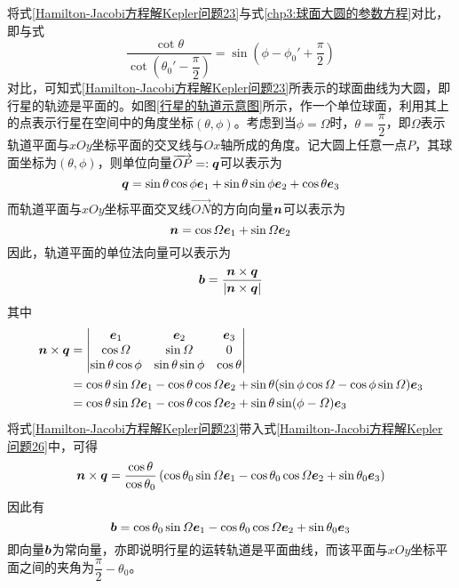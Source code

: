 将式\eqref{Hamilton-Jacobi方程解Kepler问题23}与式\eqref{chp3:球面大圆的参数方程}对比，即与式
\begin{equation}
	\frac{\cot\theta}{\cot\left(\theta_0'-\dfrac{\pi}{2}\right)} = \sin\left(\phi-\phi_0'+\frac{\pi}{2}\right)
	\label{Hamilton-Jacobi方程解Kepler问题24}
\end{equation}
对比，可知式\eqref{Hamilton-Jacobi方程解Kepler问题23}所表示的球面曲线为大圆，即行星的轨迹是平面的。如图\ref{行星的轨道示意图}所示，作一个单位球面，利用其上的点表示行星在空间中的角度坐标$(\theta,\phi)$。考虑到当$\phi=\varOmega$时，$\theta=\dfrac{\pi}{2}$，即$\varOmega$表示轨道平面与$xOy$坐标平面的交叉线与$Ox$轴所成的角度。记大圆上任意一点$P$，其球面坐标为$(\theta,\phi)$，则单位向量$\overrightarrow{OP}=:\boldsymbol{q}$可以表示为
\begin{equation}
	\boldsymbol{q} = \sin\theta\cos\phi\boldsymbol{e}_1+\sin\theta\sin\phi\boldsymbol{e}_2+\cos\theta\boldsymbol{e}_3
	\label{Hamilton-Jacobi方程解Kepler问题24-q}
\end{equation}
而轨道平面与$xOy$坐标平面交叉线$\overrightarrow{ON}$的方向向量$\boldsymbol{n}$可以表示为
\begin{equation}
	\boldsymbol{n} = \cos\varOmega\boldsymbol{e}_1+\sin\varOmega\boldsymbol{e}_2
	\label{Hamilton-Jacobi方程解Kepler问题24-n}
\end{equation}
因此，轨道平面的单位法向量可以表示为
\begin{equation}
	\boldsymbol{b} = \frac{\boldsymbol{n}\times \boldsymbol{q}}{|\boldsymbol{n}\times \boldsymbol{q}|}
	\label{Hamilton-Jacobi方程解Kepler问题25}
\end{equation}
其中
\begin{align}
	\boldsymbol{n}\times \boldsymbol{q} & = \begin{vmatrix} \boldsymbol{e}_1 & \boldsymbol{e}_2 & \boldsymbol{e}_3 \\ \cos\varOmega & \sin\varOmega & 0 \\ \sin\theta\cos\phi & \sin\theta\sin\phi & \cos\theta \end{vmatrix} \nonumber \\
	& = \cos\theta\sin\varOmega\boldsymbol{e}_1 - \cos\theta\cos\varOmega\boldsymbol{e}_2+\sin\theta(\sin\phi\cos\varOmega-\cos\phi\sin\varOmega)\boldsymbol{e}_3 \nonumber \\
	& = \cos\theta\sin\varOmega\boldsymbol{e}_1 - \cos\theta\cos\varOmega\boldsymbol{e}_2+\sin\theta\sin(\phi-\varOmega)\boldsymbol{e}_3
	\label{Hamilton-Jacobi方程解Kepler问题26}
\end{align}
将式\eqref{Hamilton-Jacobi方程解Kepler问题23}带入式\eqref{Hamilton-Jacobi方程解Kepler问题26}中，可得
\begin{equation}
	\boldsymbol{n}\times \boldsymbol{q} = \frac{\cos\theta}{\cos\theta_0}\left(\cos\theta_0\sin\varOmega\boldsymbol{e}_1-\cos\theta_0\cos\varOmega\boldsymbol{e}_2+\sin\theta_0\boldsymbol{e}_3\right)
	\label{Hamilton-Jacobi方程解Kepler问题27}
\end{equation}
因此有
\begin{equation}
	\boldsymbol{b} = \cos\theta_0\sin\varOmega\boldsymbol{e}_1-\cos\theta_0\cos\varOmega\boldsymbol{e}_2+\sin\theta_0\boldsymbol{e}_3
	\label{Hamilton-Jacobi方程解Kepler问题28}
\end{equation}
即向量$\boldsymbol{b}$为常向量，亦即说明行星的运转轨道是平面曲线，而该平面与$xOy$坐标平面之间的夹角为$\dfrac{\pi}{2}-\theta_0$。

